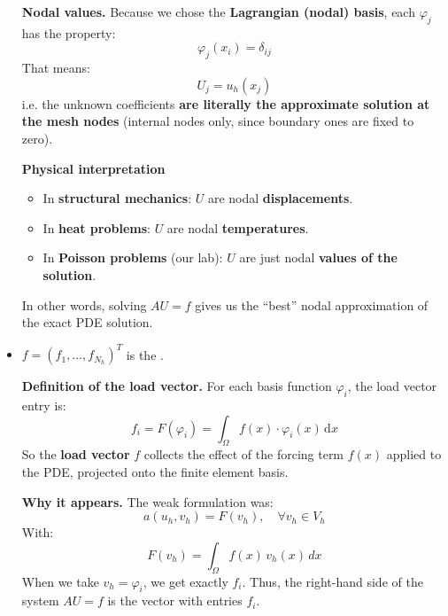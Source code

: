 \begin{itemize}
    \textcolor{Green3}{ \textbf{Nodal values.}} Because we chose the \textbf{Lagrangian (nodal) basis}, each $\varphi_{j}$ has the property:
    \begin{equation*}
        \varphi_j(x_i) = \delta_{ij}
    \end{equation*}
    That means:
    \begin{equation*}
        U_j = u_h(x_j)
    \end{equation*}
    i.e. the unknown coefficients \textbf{are literally the approximate solution at the mesh nodes} (internal nodes only, since boundary ones are fixed to zero).

    \textcolor{Green3}{ \textbf{Physical interpretation}}
    \begin{itemize}
        \item In \textbf{structural mechanics}: $U$ are nodal \textbf{displacements}.
        \item In \textbf{heat problems}: $U$ are nodal \textbf{temperatures}.
        \item In \textbf{Poisson problems} (our lab): $U$ are just nodal \textbf{values of the solution}.
    \end{itemize}
    In other words, solving $AU=f$ gives us the ``best'' nodal approximation of the exact PDE solution.


    \item $f = \left(f_1,\dots,f_{N_h}\right)^{T}$ is the .

    \textcolor{Green3}{ \textbf{Definition of the load vector.}} For each basis function $\varphi_i$, the load vector entry is:
    \begin{equation*}
        f_i = F\left(\varphi_i\right) = \displaystyle\int_\Omega f(x) \cdot \varphi_i(x)\,\mathrm{d}x
    \end{equation*}
    So the \textbf{load vector} $f$ collects the effect of the forcing term $f(x)$ applied to the PDE, projected onto the finite element basis.

    \textcolor{Green3}{ \textbf{Why it appears.}} The weak formulation was:
    \begin{equation*}
        a(u_h, v_h) = F(v_h), \quad \forall v_h \in V_h
    \end{equation*}
    With:
    \begin{equation*}
        F(v_h) = \int_\Omega f(x)\,v_h(x)\,dx
    \end{equation*}
    When we take $v_h = \varphi_i$, we get exactly $f_i$. Thus, the right-hand side of the system $AU=f$ is the vector with entries $f_i$.


\end{itemize}
